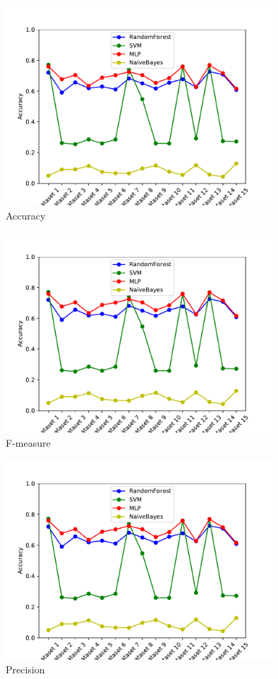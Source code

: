 \begin{figure}[H]
    \centering
    \includegraphics[page=1, width=100mm]{images/results_scikit.pdf}
    \caption{Accuracy}
    \label{fig_scikit_accuracy}
\end{figure}

\begin{figure}[H]
    \centering
    \includegraphics[page=2, width=100mm]{images/results_scikit.pdf}
    \caption{F-measure}
    \label{fig_scikit_f1}
\end{figure}

\begin{figure}[H]
    \centering
    \includegraphics[page=3, width=100mm]{images/results_scikit.pdf}
    \caption{Precision}
    \label{fig_scikit_prec}
\end{figure}

